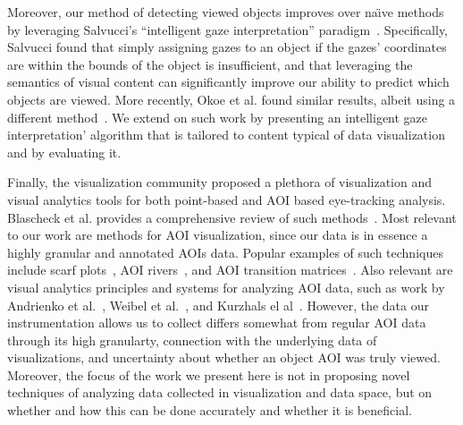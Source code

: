 Moreover, our method of detecting viewed objects improves over na\"{\i}ve methods by leveraging Salvucci's ``intelligent gaze interpretation'' paradigm~\cite{salvucci1999inferring,salvucci2000intelligent}. Specifically, Salvucci found that simply assigning gazes to an object if the gazes' coordinates are within the bounds of the object is insufficient, and that leveraging the semantics of visual content can significantly improve our ability to predict which objects are viewed. More recently, Okoe et al. found similar results, albeit using a different method~\cite{okoe2014gaze,okoe2using}. We extend on such work by presenting an intelligent gaze interpretation' algorithm that is tailored to content typical of data visualization and by evaluating it.
 
Finally, the visualization community proposed a plethora of visualization and visual analytics tools for both point-based and AOI based eye-tracking analysis. Blascheck et al. provides a comprehensive review of such methods~\cite{blascheckstate}. Most relevant to our work are methods for AOI visualization, since our data is in essence a highly granular and annotated AOIs data. Popular examples of such techniques include scarf plots~\cite{richardson2005looking}, AOI rivers~\cite{burch2013aoi}, and AOI transition matrices~\cite{goldberg1999computer}. Also relevant are visual analytics principles and systems for analyzing AOI data, such as work by Andrienko et al.~\cite{andrienko2012visual}, Weibel et al.~\cite{weibel2012let}, and Kurzhals el al~\cite{kurzhals2014iseecube}. However, the data our instrumentation allows us to collect differs somewhat from regular AOI data through its high granularty, connection with the underlying data of visualizations, and uncertainty about whether an object AOI was truly viewed. Moreover, the focus of the work we present here is not in proposing novel techniques of analyzing data collected in visualization and data space, but on whether and how this can be done accurately and whether it is beneficial.

